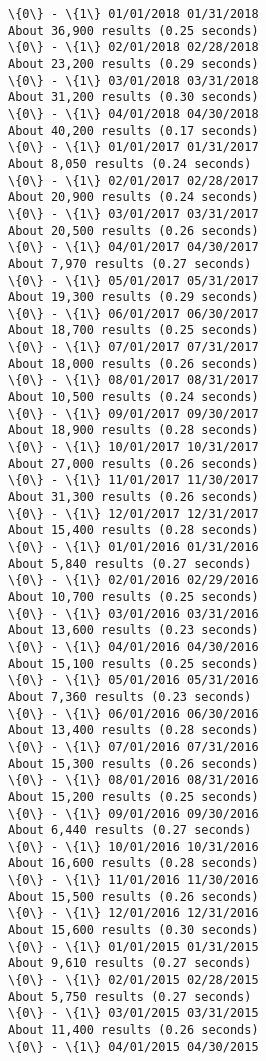 \documentclass[11pt]{article}
\begin{document}
    \begin{Verbatim}[commandchars=\\\{\}]
\{0\} - \{1\} 01/01/2018 01/31/2018
About 36,900 results (0.25 seconds) 
\{0\} - \{1\} 02/01/2018 02/28/2018
About 23,200 results (0.29 seconds) 
\{0\} - \{1\} 03/01/2018 03/31/2018
About 31,200 results (0.30 seconds) 
\{0\} - \{1\} 04/01/2018 04/30/2018
About 40,200 results (0.17 seconds) 
\{0\} - \{1\} 01/01/2017 01/31/2017
About 8,050 results (0.24 seconds) 
\{0\} - \{1\} 02/01/2017 02/28/2017
About 20,900 results (0.24 seconds) 
\{0\} - \{1\} 03/01/2017 03/31/2017
About 20,500 results (0.26 seconds) 
\{0\} - \{1\} 04/01/2017 04/30/2017
About 7,970 results (0.27 seconds) 
\{0\} - \{1\} 05/01/2017 05/31/2017
About 19,300 results (0.29 seconds) 
\{0\} - \{1\} 06/01/2017 06/30/2017
About 18,700 results (0.25 seconds) 
\{0\} - \{1\} 07/01/2017 07/31/2017
About 18,000 results (0.26 seconds) 
\{0\} - \{1\} 08/01/2017 08/31/2017
About 10,500 results (0.24 seconds) 
\{0\} - \{1\} 09/01/2017 09/30/2017
About 18,900 results (0.28 seconds) 
\{0\} - \{1\} 10/01/2017 10/31/2017
About 27,000 results (0.26 seconds) 
\{0\} - \{1\} 11/01/2017 11/30/2017
About 31,300 results (0.26 seconds) 
\{0\} - \{1\} 12/01/2017 12/31/2017
About 15,400 results (0.28 seconds) 
\{0\} - \{1\} 01/01/2016 01/31/2016
About 5,840 results (0.27 seconds) 
\{0\} - \{1\} 02/01/2016 02/29/2016
About 10,700 results (0.25 seconds) 
\{0\} - \{1\} 03/01/2016 03/31/2016
About 13,600 results (0.23 seconds) 
\{0\} - \{1\} 04/01/2016 04/30/2016
About 15,100 results (0.25 seconds) 
\{0\} - \{1\} 05/01/2016 05/31/2016
About 7,360 results (0.23 seconds) 
\{0\} - \{1\} 06/01/2016 06/30/2016
About 13,400 results (0.28 seconds) 
\{0\} - \{1\} 07/01/2016 07/31/2016
About 15,300 results (0.26 seconds) 
\{0\} - \{1\} 08/01/2016 08/31/2016
About 15,200 results (0.25 seconds) 
\{0\} - \{1\} 09/01/2016 09/30/2016
About 6,440 results (0.27 seconds) 
\{0\} - \{1\} 10/01/2016 10/31/2016
About 16,600 results (0.28 seconds) 
\{0\} - \{1\} 11/01/2016 11/30/2016
About 15,500 results (0.26 seconds) 
\{0\} - \{1\} 12/01/2016 12/31/2016
About 15,600 results (0.30 seconds) 
\{0\} - \{1\} 01/01/2015 01/31/2015
About 9,610 results (0.27 seconds) 
\{0\} - \{1\} 02/01/2015 02/28/2015
About 5,750 results (0.27 seconds) 
\{0\} - \{1\} 03/01/2015 03/31/2015
About 11,400 results (0.26 seconds) 
\{0\} - \{1\} 04/01/2015 04/30/2015


\end{Verbatim}
\end{document}
